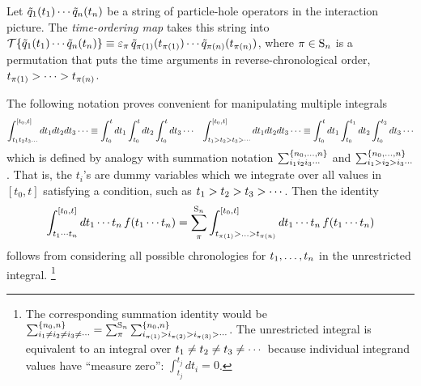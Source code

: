 \documentclass[11pt]{article}
\numberwithin{equation}{section}
\begin{document}
\begin{dfn}
\label{dfn:time-ordering}
Let 
$
  \tilde{q}_1(t_1)\cdots \tilde{q}_n(t_n)
$
be a string of particle-hole operators in the interaction picture.\footnotemark
{}
The \textit{time-ordering map} takes this string into
$
  \mc{T}\{
  \tl{q}_1(t_1)\cd \tl{q}_n(t_n)
  \}
\equiv
  \e_\pi \,\tl{q}_{\pi(1)}(t_{\pi(1)})\cd \tl{q}_{\pi(n)}(t_{\pi(n)})
$,
where $\pi\in\mr{S}_n$ is a permutation that puts the time arguments in reverse-chronological order, $t_{\pi(1)}>\cd>t_{\pi(n)}$.
\end{dfn}

\begin{ntt}
The following notation proves convenient for manipulating multiple integrals
\begin{align}
  \int_{t_1t_2t_3\ldots}^{[t_0,t]}
  dt_1dt_2dt_3\cdots
\equiv
  \int_{t_0}^t
  dt_1
  \int_{t_0}^t
  dt_2
  \int_{t_0}^t
  dt_3
  \cdots
&&
  \int_{t_1>t_2>t_3>\cdots}^{[t_0,t]}
  dt_1dt_2dt_3\cdots
\equiv
  \int_{t_0}^t
  dt_1
  \int_{t_0}^{t_1}
  dt_2
  \int_{t_0}^{t_2}
  dt_3
  \cdots
\end{align}
which is defined by analogy with summation notation
$
  \sum_{i_1i_2i_3\cdots}^{\{n_0,\ldots,n\}}
$
and
$
  \sum_{i_1>i_2>i_3\cdots}^{\{n_0,\ldots,n\}}
$.
That is, the $t_i$'s are dummy variables which we integrate over all values in $[t_0,t]$ satisfying a condition, such as $t_1>t_2>t_3>\cdots$.
Then the identity
\begin{align}
\label{eq:integral-identity}
  \int_{t_1\cd t_n}^{[t_0,t]}
  dt_1\cd t_n\,
  f(t_1\cd t_n)
=
  \sum_\pi^{\mr{S}_n}
  \int_{t_{\pi(1)}>\ld>t_{\pi(n)}}^{[t_0,t]}
  dt_1\cd t_n\,
  f(t_1\cd t_n)
\end{align}
follows from considering all possible chronologies for $t_1,\ldots,t_n$ in the unrestricted integral.\footnotemark
\footnote{
  The corresponding summation identity would be
$
  \sum_{i_1\neq i_2\neq i_3\neq\cd}^{\{n_0,n\}}
=
  \sum_{\pi}^{\mr{S}_n}
  \sum_{i_{\pi(1)}> i_{\pi(2)}> i_{\pi(3)}>\cd}^{\{n_0,n\}}
$.
  The unrestricted integral is equivalent to an integral over $t_1\neq t_2\neq t_3\neq\cdots$ because individual integrand values have ``measure zero'':
$
  \int_{t_j}^{t_j}
  dt_i
=
  0
$.
}
\end{ntt}
\end{document}
